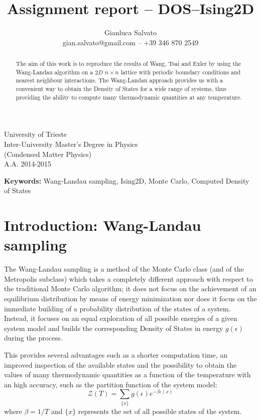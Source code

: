 \documentclass[11pt]{article}
\title{Assignment report -- DOS--Ising2D}
\author{Gianluca Salvato\\\small{gian.salvato@gmail.com -- +39 346 870 2549}}
\newenvironment{keywords}{\begin{adjustwidth}{5.2em}{5.2em}\footnotesize\textbf{Keywords:}}{\end{adjustwidth}}
\begin{document}
\VerbatimFootnotes
\DefineShortVerb{\|}

\maketitle
\begin{center}
	University of Trieste\\
	Inter-University Master’s Degree in Physics\\
	(Condensed Matter Physics)\\
	A.A. 2014-2015
\end{center}

\begin{abstract}
The aim of this work is to reproduce the results of Wang, Tsai and Exler \cite{bib:wang_landau} by using the Wang-Landau algorithm on a $2D$ $n\times n$ lattice with periodic boundary conditions and nearest neighbour interactions. The Wang-Landau approach provides us with a convenient way to obtain the Density of States for a wide range of systems, thus providing the ability to compute many thermodynamic quantities at any temperature.
\end{abstract}
\begin{keywords}
Wang-Landau sampling, Ising2D, Monte Carlo, Computed Density of States
\end{keywords}

\section{Introduction: Wang-Landau sampling}

The Wang-Landau sampling is a method of the Monte Carlo class (and of the Metropolis subclass) which takes a completely different approach with respect to the traditional Monte Carlo algorithm; it does not focus on the achievement of an equilibrium distribution by means of energy minimization nor does it focus on the immediate building of a probability distribution of the states of a system.
Instead, it focuses on an equal exploration of all possible energies of a given system model and builds the corresponding Density of States in energy $g(\epsilon)$ during the process.

This provides several advantages such as a shorter computation time, an improved inspection of the available states and the possibility to obtain the values of many thermodynamic quantities as a function of the temperature with an high accuracy, such as the partition function of the system model:
\[
	\mathcal Z(T) = \sum_{\{x\}}g(\epsilon)e^{-\beta \epsilon(x)}
\]
where $\beta = 1/T$ and $\{x\}$ represents the set of all possible states of the system.
\end{document}

